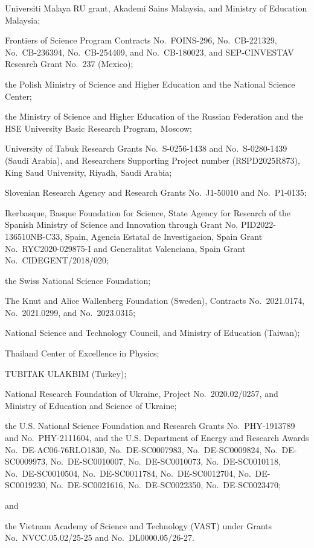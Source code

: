 Universiti Malaya RU grant, Akademi Sains Malaysia, and Ministry of Education Malaysia;


Frontiers of Science Program Contracts
No.~FOINS-296,
No.~CB-221329,
No.~CB-236394,
No.~CB-254409,
and
No.~CB-180023, and SEP-CINVESTAV Research Grant No.~237 (Mexico);

the Polish Ministry of Science and Higher Education and the National Science Center;

the Ministry of Science and Higher Education of the Russian Federation
and
the HSE University Basic Research Program, Moscow;

University of Tabuk Research Grants
No.~S-0256-1438 and No.~S-0280-1439 (Saudi Arabia), and
Researchers Supporting Project number (RSPD2025R873), King Saud University, Riyadh,
Saudi Arabia;

Slovenian Research Agency and Research Grants
No.~J1-50010
and
No.~P1-0135;

Ikerbasque, Basque Foundation for Science,
State Agency for Research of the Spanish Ministry of Science and Innovation through Grant No. PID2022-136510NB-C33, Spain,
Agencia Estatal de Investigacion, Spain
Grant No.~RYC2020-029875-I
and
Generalitat Valenciana, Spain
Grant No.~CIDEGENT/2018/020;

the Swiss National Science Foundation;

The Knut and Alice Wallenberg Foundation (Sweden), Contracts No.~2021.0174, No.~2021.0299, and No.~2023.0315;

National Science and Technology Council,
and
Ministry of Education (Taiwan);

Thailand Center of Excellence in Physics;

TUBITAK ULAKBIM (Turkey);

National Research Foundation of Ukraine, Project No.~2020.02/0257,
and
Ministry of Education and Science of Ukraine;

the U.S. National Science Foundation and Research Grants
No.~PHY-1913789
and
No.~PHY-2111604,
and the U.S. Department of Energy and Research Awards
No.~DE-AC06-76RLO1830,
No.~DE-SC0007983,
No.~DE-SC0009824,
No.~DE-SC0009973,
No.~DE-SC0010007,
No.~DE-SC0010073,
No.~DE-SC0010118,
No.~DE-SC0010504,
No.~DE-SC0011784,
No.~DE-SC0012704,
No.~DE-SC0019230,
No.~DE-SC0021616,
No.~DE-SC0022350,
No.~DE-SC0023470;

and

the Vietnam Academy of Science and Technology (VAST) under Grants
No.~NVCC.05.02/25-25
and
No.~DL0000.05/26-27.


